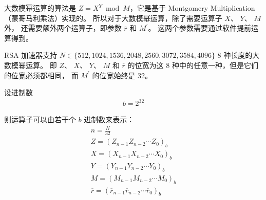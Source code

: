 \documentclass[main\_\_CN.tex]{subfiles}
\begin{document}
大数模幂运算的算法是 \begin{math}Z = X^{Y} \bmod M\end{math}，它是基于 Montgomery Multiplication （蒙哥马利乘法）实现的。
所以对于大数模幂运算，除了需要运算子
\begin{math}X\end{math}、
\begin{math}Y\end{math}、
\begin{math}M\end{math}外，
还需要额外两个运算子，即参数
\begin{math}\overline{r}\end{math} 和 
\begin{math}M^{\prime}\end{math}。
这两个参数需要通过软件提前运算得到。

RSA 加速器支持
\begin{math}N \in \{512,1024,1536,2048,2560,3072,3584,4096\}\end{math} 
8 种长度的大数模幂运算。
即
\begin{math}Z\end{math}、
\begin{math}X\end{math}、
\begin{math}Y\end{math}、
\begin{math}M\end{math} 和 
\begin{math}\overline{r}\end{math}
的位宽为这 8 种中的任意一种，但是它们的位宽必须都相同，
而 \begin{math}M^{\prime}\end{math} 的位宽始终是 32。

设进制数
\begin{gather*}
    b = 2^{32}
\end{gather*}

则运算子可以由若干个 \begin{math}b\end{math} 进制数来表示：
\begin{gather*}
    n = \frac{N}{32} \\
    Z = ( Z_{n-1} Z_{n-2} \cdots Z_{0} )_{b} \\
    X = ( X_{n-1} X_{n-2} \cdots X_{0} )_{b} \\
    Y = ( Y_{n-1} Y_{n-2} \cdots Y_{0} )_{b} \\
    M = ( M_{n-1} M_{n-2} \cdots M_{0} )_{b} \\
    \overline{r} = ( \overline{r}_{n-1} \overline{r}_{n-2} \cdots \overline{r}_{0} )_{b}
\end{gather*}
\end{document}
